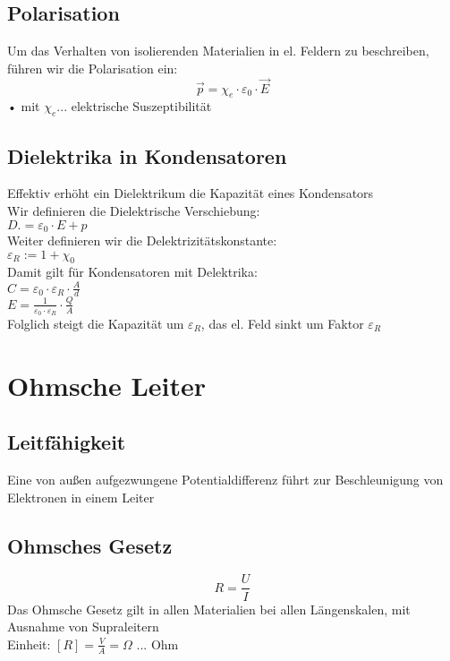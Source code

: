\documentclass[a4paper,12pt]{report}
\begin{document}
\subsection{Polarisation}
Um das Verhalten von isolierenden Materialien in el. Feldern zu beschreiben, führen wir die Polarisation ein:
\begin{equation}
\vec{p} = \chi_e \cdot \varepsilon_0 \cdot \vec{E} 
\end{equation}•
mit $ \chi_e ... $ elektrische Suszeptibilität



\subsection{Dielektrika in Kondensatoren}
Effektiv erhöht ein Dielektrikum die Kapazität eines Kondensators\\
Wir definieren die Dielektrische Verschiebung:\\
$ D .= \varepsilon_0 \cdot E + p $\\
Weiter definieren wir die Delektrizitätskonstante:\\
$ \varepsilon_R := 1+ \chi_0 $ \\

Damit gilt für Kondensatoren mit Delektrika:\\
$ C = \varepsilon_0 \cdot \varepsilon_R \cdot \frac{A}{d} $\\
$ E = \frac{1}{\varepsilon_0\cdot\varepsilon_R}\cdot \frac{Q}{A}$\\
Folglich steigt die Kapazität um $\varepsilon_R $, das el. Feld sinkt um Faktor $ \varepsilon_R$\\

\section{Ohmsche Leiter}


\subsection{Leitfähigkeit}
Eine von außen aufgezwungene Potentialdifferenz führt zur Beschleunigung von Elektronen in einem Leiter

\subsection{Ohmsches Gesetz}
\begin{equation}
R = \frac{U}{I}
\end{equation}
Das Ohmsche Gesetz gilt in allen Materialien bei allen Längenskalen, mit Ausnahme von Supraleitern\\
Einheit: $ [R] = \frac{V}{A} = \Omega $ ... Ohm \\
\end{document}
